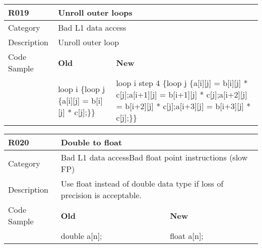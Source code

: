 \begin{tabular}{|p{0.9in}|p{2.0in}|p{2.0in}|} \hline
\textbf{R019}       & \multicolumn{2}{|p{4.0in}|}{\textbf{Unroll outer loops}} \\ \hline
Category            & \multicolumn{2}{|p{4.0in}|}{Bad L1 data access} \\ \hline
Description         & \multicolumn{2}{|p{4.0in}|}{Unroll outer loop} \\ \hline
Code Sample         & \textbf{Old} & \textbf{New} \\ \hline
                    & loop i \{\newline   loop j \{\newline     a[i][j] = b[i][j] * c[j];\newline   \}\newline \}
                    & loop i step 4 \{\newline   loop j \{\newline     a[i][j] = b[i][j] * c[j];\newline     a[i+1][j] = b[i+1][j] * c[j];\newline     a[i+2][j] = b[i+2][j] * c[j];\newline     a[i+3][j] = b[i+3][j] * c[j];\newline   \}\newline \} \\ \hline
\end{tabular}

\begin{tabular}{|p{0.9in}|p{2.0in}|p{2.0in}|} \hline
\textbf{R020}       & \multicolumn{2}{|p{4.0in}|}{\textbf{Double to float}} \\ \hline
Category            & \multicolumn{2}{|p{4.0in}|}{Bad L1 data access\newline Bad float point instructions (slow FP)} \\ \hline
Description         & \multicolumn{2}{|p{4.0in}|}{Use float instead of double data type if loss of precision is acceptable.} \\ \hline
Code Sample         & \textbf{Old} & \textbf{New} \\ \hline
                    & double a[n]; & float a[n]; \\ \hline
\end{tabular}

